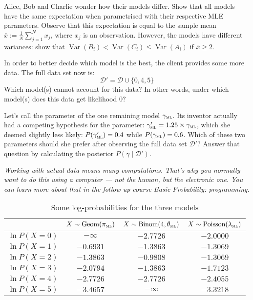 \documentclass[a4paper,10pt,landscape,twocolumn]{scrartcl}
\DeclareMathOperator{\Var}{Var}
\begin{document}
\begin{exercise}
  \begin{subex}[1pt]
    Alice, Bob and Charlie wonder how their models differ. Show that all models
    have the same expectation when parametrised with their respective MLE
    parameters. Observe that this expectation is equal to the sample mean
    $\overline x := \frac{1}{N} \sum_{j=1}^N x_j$, where $x_j$ is an
    observation. However, the models have different variances: show that
    $\Var(B_i) < \Var(C_i) \leq \Var(A_i)$ if $\overline x \ge 2$. 	
  \end{subex}
  
  \begin{subex}[0.5pt]
    In order to better decide which model is the best, the client provides some
    more data. The full data set now is:
    \[
      \mathcal D' = \mathcal D \cup \{ 0, 4, 5 \}
    \]
    Which model(s) cannot account for this data? In other words, under which
    model(s) does this data get likelihood 0?
  \end{subex}
	
  \begin{subex}[1pt]
    Let's call the parameter of the one remaining model $\gamma_\textsc{ml}$.
    Its inventor actually had a competing hypothesis for the parameter:
    $\gamma_\textsc{ml}' = 1.25 \times \gamma_\textsc{ml}$, which she deemed
    slightly less likely: $P(\gamma_\textsc{ml}') = 0.4$ while
    $P(\gamma_\textsc{ml}) = 0.6$. Which of these two parameters should she
    prefer after observing the full data set $\mathcal{D'}$? Answer that
    question by calculating the posterior $P(\gamma \mid \mathcal{D'})$.
  \end{subex}
  
  \bigbreak\noindent
  \emph{Working with actual data means many computations. That's why you
  normally want to do this using a computer --- not the human, but the
  electronic one. You can learn more about that in the follow-up course
  \emph{Basic Probability: programming}.}
\end{exercise}

\begin{table}
  \begin{tabular}{l c c c}
  \toprule
    & 	$X \sim \text{Geom}(\pi_\textsc{ml})$
    &	$X \sim \text{Binom}(4, \theta_\textsc{ml})$
    &	$X \sim \text{Poisson}(\lambda_\textsc{ml})$ \\\midrule
    $\ln P(X = 0)$ &$-\infty$ &$-2.7726$ &$-2.0000$ \\
    $\ln P(X = 1)$ &$-0.6931$ &$-1.3863$ &$-1.3069$ \\
    $\ln P(X = 2)$ &$-1.3863$ &$-0.9808$ &$-1.3069$ \\
    $\ln P(X = 3)$ &$-2.0794$ &$-1.3863$ &$-1.7123$ \\
    $\ln P(X = 4)$ &$-2.7726$ &$-2.7726$ &$-2.4055$ \\
    $\ln P(X = 5)$ &$-3.4657$ &$-\infty$ &$-3.3218$ \\\bottomrule
  \end{tabular}
  \caption{Some log-probabilities for the three models \label{table}}
\end{table}
\end{document}
